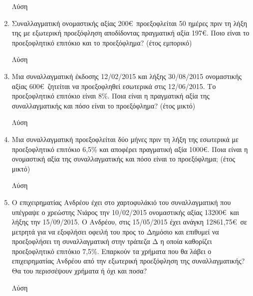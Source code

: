 \documentclass[a4paper,12pt]{article}
\begin{document}
\begin{enumerate}
\hspace{.15\textwidth}Λύση

\vspace{3cm}

\item Συναλλαγματική ονομαστικής αξίας 200\euro\ προεξοφλείται 50 ημέρες πριν τη λήξη της με εξωτερική προεξόφληση αποδίδοντας πραγματική αξία 197\euro. Ποιο είναι το προεξοφλητικό επιτόκιο και το προεξόφλημα? (έτος εμπορικό)

\hspace{.15\textwidth}Λύση

\vspace{3cm}

\item Μια συναλλαγματική έκδοσης 12/02/2015 και λήξης 30/08/2015 ονομαστικής αξίας 600\euro\ ζητείται να προεξοφληθεί εσωτερικά στις 12/06/2015. Το προεξοφλητικό επιτόκιο είναι 8\%. Ποια είναι η πραγματική αξία της συναλλαγματικής και πόσο είναι το προεξόφλημα? (έτος μικτό)

\hspace{.15\textwidth}Λύση

\vspace{3cm}

\item Μια συναλλαγματική προεξοφλείται δύο μήνες πριν τη λήξη της εσωτερικά με προεξοφλητικό επιτόκιο 6,5\% και αποφέρει πραγματική αξία 1000\euro. Ποια είναι η ονομαστική αξία της συναλλαγματικής και πόσο είναι το προεξόφλημα; (έτος μικτό)

\hspace{.15\textwidth}Λύση

\vspace{3cm}

\item Ο επιχειρηματίας Ανδρέου έχει στο χαρτοφυλάκιό του συναλλαγματική που υπέγραψε ο χρεώστης Νιάρος την 10/02/2015 ονομαστικής αξίας 13200\euro\ και λήξης την 15/09/2015. Ο Ανδρέου, στις 15/05/2015 έχει ανάγκη 12861,75\euro\ σε μετρητά για να εξοφλήσει οφειλή του προς το Δημόσιο και επιθυμεί να προεξοφλήσει τη συναλλαγματική στην τράπεζα Δ η οποία καθορίζει προεξοφλητικό επιτόκιο 7,5\%. Επαρκούν τα χρήματα που θα λάβει ο επιχειρηματίας Ανδρέου από την εξωτερική προεξόφληση της συναλλαγματικής? Θα του περισσέψουν χρήματα ή όχι και ποσα?

\hspace{.15\textwidth}Λύση

\vspace{4cm}


\end{enumerate}
\end{document}
